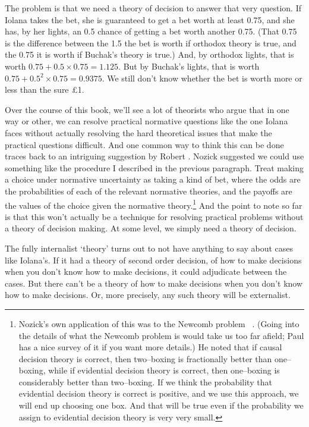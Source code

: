 The problem is that we need a theory of decision to answer that very question. If \gls{Iolana} takes the bet, she is guaranteed to get a bet worth at least 0.75, and she has, by her lights, an 0.5 chance of getting a bet worth another 0.75. (That 0.75 is the difference between the 1.5 the bet is worth if orthodox theory is true, and the 0.75 it is worth if Buchak's theory is true.) And, by orthodox lights, that is worth $0.75 + 0.5 \times 0.75 = 1.125$. But by Buchak's lights, that is worth $0.75 + 0.5^2 \times 0.75 = 0.9375$. We still don't know whether the bet is worth more or less than the sure £1.

Over the course of this book, we'll see a lot of theorists who argue that in one way or other, we can resolve practical normative questions like the one \gls{Iolana} faces without actually resolving the hard theoretical issues that make the practical questions difficult. And one common way to think this can be done traces back to an intriguing suggestion by Robert \citet{Nozick1994}. Nozick suggested we could use something like the procedure I described in the previous paragraph. Treat making a choice under normative uncertainty as taking a kind of bet, where the odds are the probabilities of each of the relevant normative theories, and the payoffs are the values of the choice given the normative theory.\footnote{Nozick's own application of this was to the Newcomb problem ~\citep{Nozick1969}. (Going into the details of what the Newcomb problem is would take us too far afield; Paul \citet{Weyrich2012} has a nice survey of it if you want more details.) He noted that if causal decision theory is correct, then two--boxing is fractionally better than one--boxing, while if evidential decision theory is correct, then one--boxing is considerably better than two--boxing. If we think the probability that evidential decision theory is correct is positive, and we use this approach, we will end up choosing one box. And that will be true even if the probability we assign to evidential decision theory is very very small.} And the point to note so far is that this won't actually be a technique for resolving practical problems without a theory of decision making. At some level, we simply need a theory of decision.

The fully internalist `theory' turns out to not have anything to say about cases like \gls{Iolana}'s. If it had a theory of second order decision, of how to make decisions when you don't know how to make decisions, it could adjudicate between the cases. But there can't be a theory of how to make decisions when you don't know how to make decisions. Or, more precisely, any such theory will be externalist.


